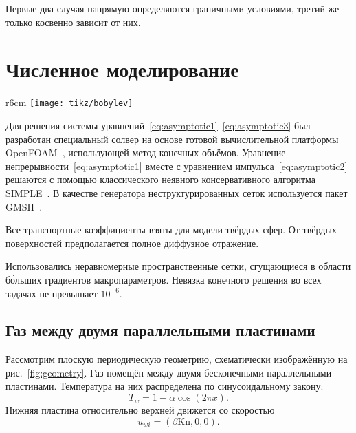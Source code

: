 \documentclass[english,russian,a4paper,10pt]{article}
\newcommand{\Kn}{\mathrm{Kn}}
\begin{document}
Первые два случая напрямую определяются граничными условиями, третий же только косвенно зависит
от них.

\section{Численное моделирование}

\begin{wrapfigure}{r}{6cm}
	\vspace{-20pt}
	\centering
	\texttt{[image: tikz/bobylev]}
	\vspace{-20pt}
	\caption{Геометрия задачи}\label{fig:geometry}
	\vspace{-5pt}
\end{wrapfigure}

Для решения системы уравнений~\eqref{eq:asymptotic1}--\eqref{eq:asymptotic3} был разработан
специальный солвер на основе готовой вычислительной платформы OpenFOAM\textregistered{}~\cite{Tabor1998},
использующей метод конечных объёмов.
Уравнение непрерывности~\eqref{eq:asymptotic1} вместе с уравнением импульса~\eqref{eq:asymptotic2}
решаются с помощью классического неявного консервативного алгоритма SIMPLE~\cite{Caretto1972}.
В качестве генератора неструктурированных сеток используется пакет GMSH~\cite{Geuzaine2009}.

Все транспортные коэффициенты взяты для модели твёрдых сфер.
От твёрдых поверхностей предполагается полное диффузное отражение.

Использовались неравномерные пространственные сетки, сгущающиеся в области б\'{о}льших градиентов макропараметров.
Невязка конечного решения во всех задачах не превышает \(10^{-6}\).

\subsection{Газ между двумя параллельными пластинами}

Рассмотрим плоскую периодическую геометрию, схематически изображённую на рис.~\ref{fig:geometry}.
Газ помещён между двумя бесконечными параллельными пластинами.
Температура на них распределена по синусоидальному закону:
\begin{equation}
	T_w = 1-\alpha\cos(2\pi x).
\end{equation}
Нижняя пластина относительно верхней движется со скоростью
\begin{equation}
	u_{wi} = (\beta \Kn,0,0).
\end{equation}
\end{document}
